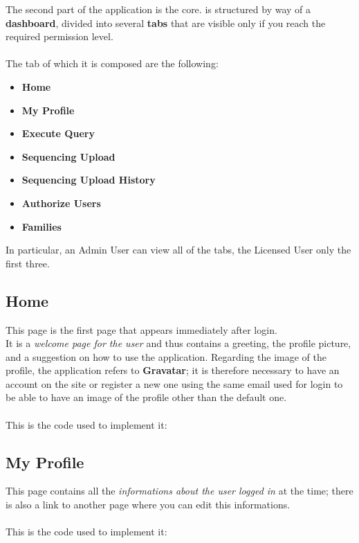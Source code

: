 The second part of the application is the core. is structured by way of a \textbf{dashboard}, divided into several \textbf{tabs} that are visible only if you reach the required permission level. 
\\
\\The tab of which it is composed are the following:

\begin{itemize}
	\item \textbf{Home}
	\item \textbf{My Profile}
	\item \textbf{Execute Query}
	\item \textbf{Sequencing Upload}
	\item \textbf{Sequencing Upload History}
	\item \textbf{Authorize Users}
	\item \textbf{Families}
\end{itemize}

In particular, an Admin User can view all of the tabs, the Licensed User only the first three. 


\subsection{Home}

This page is the first page that appears immediately after login.
\\It is a \emph{welcome page for the user} and thus contains a greeting, the profile picture, and a suggestion on how to use the application. Regarding the image of the profile, the application refers to \textbf{Gravatar}; it is therefore necessary to have an account on the site or register a new one using the same email used for login to be able to have an image of the profile other than the default one. 
\\
\\This is the code used to implement it: 




\subsection{My Profile}

This page contains all the \emph{informations about the user logged in} at the time; there is also a link to another page where you can edit this informations.
\\
\\This is the code used to implement it: 

